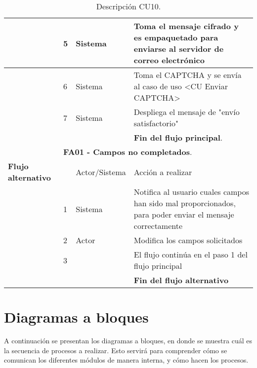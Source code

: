 \documentclass[12pt,oneside,onecolumn,openany]{report}
\begin{document}
\begin{table}[H]
{\begin{tabular}{| p{} | p{} |p{4cm}|p{5cm}|}
     \hline
     & 5 & Sistema & Toma el mensaje cifrado y es empaquetado para enviarse al servidor de correo electrónico\\
     \hline
     & 6 & Sistema & Toma el CAPTCHA  y se envía al caso de uso <CU Enviar CAPTCHA>\\
     \hline
     & 7 & Sistema & Despliega el mensaje de "envío satisfactorio"\\
     \hline
     & & & \textbf{Fin del flujo principal}.\\
     \hline
     & \multicolumn{3}{|l|}{\textbf{FA01 - Campos no completados}.}\\
     \hline
     \textbf{Flujo alternativo} & & Actor/Sistema & Acción a realizar\\
     \hline
     & 1 & Sistema & Notifica al usuario cuales campos han sido mal proporcionados, para poder enviar el mensaje correctamente\\
     \hline
     & 2 & Actor & Modifica los campos solicitados\\
     \hline
     & 3 &  & El flujo continúa en el paso 1 del flujo principal\\
     \hline
     &  & & \textbf{Fin del flujo alternativo}\\
     
     \end{tabular}
    }
    \caption{Descripción CU10.}
    \label{tabla:CU10}
\end{table}



\pagebreak
\section{Diagramas a bloques}
A continuación se presentan los diagramas a bloques, en donde se muestra cuál es la secuencia de procesos a realizar. Esto servirá para comprender cómo se comunican los diferentes módulos de manera interna, y cómo hacen los procesos.
\end{document}
